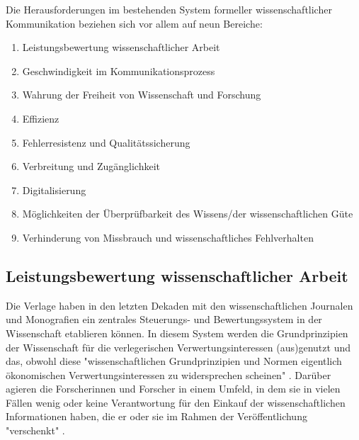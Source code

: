 Die Herausforderungen im bestehenden System formeller wissenschaftlicher Kommunikation beziehen sich vor allem auf neun Bereiche:
\begin{enumerate}
\item Leistungsbewertung wissenschaftlicher Arbeit
\item Geschwindigkeit im Kommunikationsprozess
\item Wahrung der Freiheit von Wissenschaft und Forschung
\item Effizienz
\item Fehlerresistenz und Qualitätssicherung
\item Verbreitung und Zugänglichkeit
\item Digitalisierung
\item Möglichkeiten der Überprüfbarkeit des Wissens/der wissenschaftlichen Güte
\item Verhinderung von Missbrauch und wissenschaftliches Fehlverhalten
\end{enumerate}

\subsection{Leistungsbewertung wissenschaftlicher Arbeit}

Die Verlage haben in den letzten Dekaden mit den wissenschaftlichen Journalen und Monografien ein zentrales Steuerungs- und Bewertungssystem in der Wissenschaft etablieren können. In diesem System werden die Grundprinzipien der Wissenschaft für die verlegerischen Verwertungsinteressen (aus)genutzt und das, obwohl diese "wissenschaftlichen Grundprinzipien und Normen eigentlich ökonomischen Verwertungsinteressen zu widersprechen scheinen" \cite{Hanekop_2006}. Darüber agieren die Forscherinnen und Forscher in einem Umfeld, in dem sie in vielen Fällen wenig oder keine Verantwortung für den Einkauf der wissenschaftlichen Informationen haben, die er oder sie im Rahmen der Veröffentlichung "verschenkt" \cite{Steele_2006}.

